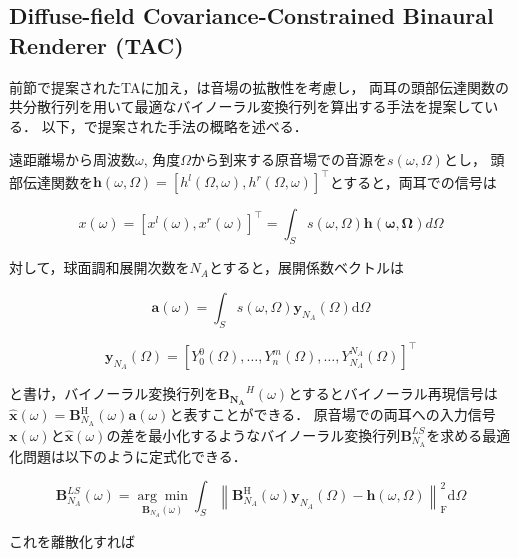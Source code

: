 \documentclass[a4paper]{jsarticle}
\begin{document}
\subsection{Diffuse-field Covariance-Constrained Binaural Renderer (TAC) \cite{Zaunschirm2018-mn}}

前節で提案されたTAに加え，\citeauthor{Zaunschirm2018-mn}\cite{Zaunschirm2018-mn}は音場の拡散性を考慮し，
両耳の頭部伝達関数の共分散行列を用いて最適なバイノーラル変換行列を算出する手法を提案している．
以下，\cite{Zaunschirm2018-mn}で提案された手法の概略を述べる．

遠距離場から周波数$\omega$, 角度$\Omega$から到来する原音場での音源を$s(\omega, \Omega)$とし，
頭部伝達関数を$\boldsymbol{h}(\omega, \Omega)=\left[h^{l}(\Omega, \omega), h^{r}(\Omega, \omega)\right]^{\top}$とすると，両耳での信号は

$$
    x(\omega)=\left[x^{l}(\omega), x^{r}(\omega)\right]^{\top}=\int_{S} s(\omega, \Omega) \mathbf{h(\omega, \Omega)} d \Omega
$$

対して，球面調和展開次数を$N_A$とすると，展開係数ベクトルは

$$
    \boldsymbol{a}(\omega)=\int_{S} s(\omega, \Omega) \boldsymbol{y}_{N_{A}}(\Omega) \mathrm{d} \Omega
$$

$$
    \boldsymbol{y}_{N_{A}}(\Omega)=\left[Y_{0}^{0}(\Omega), \ldots, Y_{n}^{m}(\Omega), \ldots, Y_{N_{A}}^{N_{A}}(\Omega)\right]^{\top}
$$

と書け，バイノーラル変換行列を$\mathbf{B_{N_A}}^H(\omega)$とするとバイノーラル再現信号は$\hat{\boldsymbol{x}}(\omega)=\boldsymbol{B}_{N_{\mathrm{A}}}^{\mathrm{H}}(\omega) \boldsymbol{a}(\omega)$と表すことができる．
原音場での両耳への入力信号$\boldsymbol{x}(\omega)$と$\hat{\boldsymbol{x}}(\omega)$の差を最小化するようなバイノーラル変換行列$\boldsymbol{B}_{N_{\mathrm{A}}}^{LS}$を求める最適化問題は以下のように定式化できる．

$$
    \boldsymbol{B}_{N_{A}}^{L S}(\omega)=\underset{\boldsymbol{B}_{N_{A}}(\omega)}{\arg \min } \int_{S}\left\|\boldsymbol{B}_{N_{A}}^{\mathrm{H}}(\omega) \boldsymbol{y}_{N_{A}}(\Omega)-\boldsymbol{h}(\omega, \Omega)\right\|_{\mathrm{F}}^{2} \mathrm{d} \Omega
$$

これを離散化すれば
\end{document}
